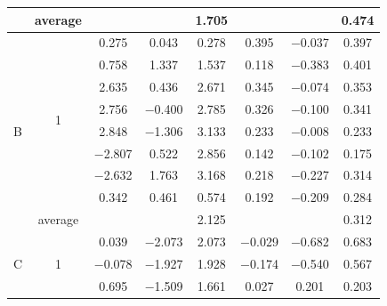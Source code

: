 \begin{table}[H]
\begin{tabular}{cccccccc}
\cline{2-8}          & average &       &       & \multicolumn{1}{c}{1.705} &       &       & \multicolumn{1}{c}{0.474} \\
    \hline
    \multirow{9}[4]{*}{B} & \multirow{8}[2]{*}{1} & \multicolumn{1}{c}{0.275} & \multicolumn{1}{c}{0.043} & \multicolumn{1}{c}{0.278} & \multicolumn{1}{c}{0.395} & \multicolumn{1}{c}{$-$0.037} & \multicolumn{1}{c}{0.397} \\
          &       & \multicolumn{1}{c}{0.758} & \multicolumn{1}{c}{1.337} & \multicolumn{1}{c}{1.537} & \multicolumn{1}{c}{0.118} & \multicolumn{1}{c}{$-$0.383} & \multicolumn{1}{c}{0.401} \\
          &       & \multicolumn{1}{c}{2.635} & \multicolumn{1}{c}{0.436} & \multicolumn{1}{c}{2.671} & \multicolumn{1}{c}{0.345} & \multicolumn{1}{c}{$-$0.074} & \multicolumn{1}{c}{0.353} \\
          &       & \multicolumn{1}{c}{2.756} & \multicolumn{1}{c}{$-$0.400} & \multicolumn{1}{c}{2.785} & \multicolumn{1}{c}{0.326} & \multicolumn{1}{c}{$-$0.100} & \multicolumn{1}{c}{0.341} \\
          &       & \multicolumn{1}{c}{2.848} & \multicolumn{1}{c}{$-$1.306} & \multicolumn{1}{c}{3.133} & \multicolumn{1}{c}{0.233} & \multicolumn{1}{c}{$-$0.008} & \multicolumn{1}{c}{0.233} \\
          &       & \multicolumn{1}{c}{$-$2.807} & \multicolumn{1}{c}{0.522} & \multicolumn{1}{c}{2.856} & \multicolumn{1}{c}{0.142} & \multicolumn{1}{c}{$-$0.102} & \multicolumn{1}{c}{0.175} \\
          &       & \multicolumn{1}{c}{$-$2.632} & \multicolumn{1}{c}{1.763} & \multicolumn{1}{c}{3.168} & \multicolumn{1}{c}{0.218} & \multicolumn{1}{c}{$-$0.227} & \multicolumn{1}{c}{0.314} \\
          &       & \multicolumn{1}{c}{0.342} & \multicolumn{1}{c}{0.461} & \multicolumn{1}{c}{0.574} & \multicolumn{1}{c}{0.192} & \multicolumn{1}{c}{$-$0.209} & \multicolumn{1}{c}{0.284} \\
\cline{2-8}          & average &       &       & \multicolumn{1}{c}{2.125} &       &       & \multicolumn{1}{c}{0.312} \\
    \hline
    \multirow{14}[14]{*}{\vspace{24pt}C} & \multirow{3}[1]{*}{1} & 0.039 & $-$2.073 & 2.073 & $-$0.029 & $-$0.682 & 0.683 \\
          &       & $-$0.078 & $-$1.927 & 1.928 & $-$0.174 & $-$0.540 & 0.567 \\
          &       & 0.695 & $-$1.509 & 1.661 & 0.027 & 0.201 & 0.203 \\

\end{tabular}
\end{table}
